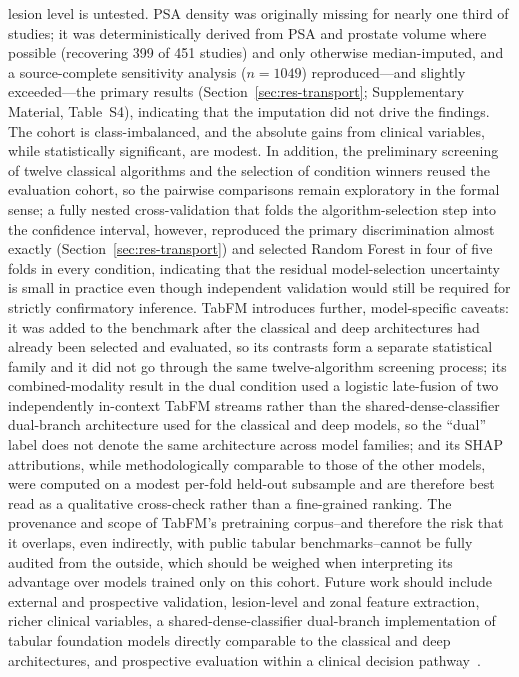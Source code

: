 \documentclass[11pt]{article}
\begin{document}
lesion level is untested. PSA density was originally missing for nearly one third
of studies; it was deterministically derived from PSA and prostate volume where
possible (recovering 399 of 451 studies) and only otherwise median-imputed, and a
source-complete sensitivity analysis ($n=1049$) reproduced---and slightly
exceeded---the primary results (Section~\ref{sec:res-transport}; Supplementary
Material, Table~S4), indicating that the imputation did not drive the findings.
The cohort is class-imbalanced,
and the absolute gains from clinical variables, while statistically significant,
are modest. In addition, the preliminary screening of twelve classical
algorithms and the selection of condition winners reused the evaluation cohort, so
the pairwise comparisons remain exploratory in the formal sense; a fully nested
cross-validation that folds the algorithm-selection step into the confidence
interval, however, reproduced the primary discrimination almost exactly
(Section~\ref{sec:res-transport}) and selected Random Forest in four of five folds
in every condition, indicating that the residual model-selection uncertainty is
small in practice even though independent validation would still be required for
strictly confirmatory inference. TabFM introduces
further, model-specific caveats: it was added to the benchmark after the
classical and deep architectures had already been selected and evaluated, so
its contrasts form a separate statistical family and it did not go through the
same twelve-algorithm screening process; its combined-modality result in the
dual condition used a logistic late-fusion of two independently in-context
TabFM streams rather than the shared-dense-classifier dual-branch architecture
used for the classical and deep models, so the ``dual'' label does not denote
the same architecture across model families; and its SHAP attributions, while
methodologically comparable to those of the other models, were computed on a
modest per-fold held-out subsample and are therefore best read as a qualitative
cross-check rather than a fine-grained ranking. The provenance and scope of TabFM's
pretraining corpus--and therefore the risk that it overlaps, even indirectly,
with public tabular benchmarks--cannot be fully audited from the outside, which
should be weighed when interpreting its advantage over models trained only on
this cohort. Future work
should include external and prospective validation,
lesion-level and zonal feature extraction, richer clinical variables,
a shared-dense-classifier dual-branch implementation of tabular foundation
models directly comparable to the classical and deep architectures, and
prospective evaluation within a clinical decision pathway~\citep{Quality2022,Lucia2024}.
\end{document}
